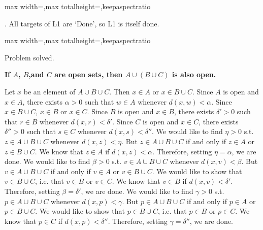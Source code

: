 \documentclass[a4paper,twoside,12pt]{article} %
\makeatletter
\DeclareRobustCommand{\_}{%
  \leavevmode\vbox{%
    \hrule\@width.4em
          \@height-.16ex
          \@depth\dimexpr.16ex+.28pt\relax}}
\newenvironment{fit}{\begin{adjustbox}{max width=\textwidth,max totalheight=\textheight,keepaspectratio}}{\end{adjustbox}}
\makeatother
\begin{document}
\begin{steps}
\begin{fit}
%
\end{fit}
\smallskip

. All targets of L1 are `Done', so L1 is itself done.\nopagebreak[4] 
\marginpar{}\nopagebreak[4] 
\smallskip\nopagebreak[4] 

\begin{fit}%
\end{fit}

Problem solved.
\cleardoublepage

\end{steps}
{\begin{center} \large \textbf{If $A$, $B$,and $C$ are open sets, then $A \cup (B \cup C)$ is also open.}\end{center}}\nopagebreak[4]

\begin{center}
\begin{minipage}{120mm}
Let $x$ be an element of $A\cup B\cup C$. Then $x\in A$ or $x\in B\cup C$. Since $A$ is open and $x\in A$, there exists $\alpha > 0$ such that $w\in A$\textrm{ whenever }$\textit{d}(x,w) < \alpha$. Since $x\in B\cup C$, $x\in B$ or $x\in C$. Since $B$ is open and $x\in B$, there exists $\delta' > 0$ such that $r\in B$\textrm{ whenever }$\textit{d}(x,r) < \delta'$. Since $C$ is open and $x\in C$, there exists $\delta'' > 0$ such that $s\in C$\textrm{ whenever }$\textit{d}(x,s) < \delta''$. We would like to find $\eta > 0$ s.t. $z\in A\cup B\cup C$\textrm{ whenever }$\textit{d}(x,z) < \eta$. But $z\in A\cup B\cup C$ if and only if $z\in A$ or $z\in B\cup C$. We know that $z\in A$ if $\textit{d}(x,z) < \alpha$. Therefore, setting $\eta = \alpha$, we are done. We would like to find $\beta > 0$ s.t. $v\in A\cup B\cup C$\textrm{ whenever }$\textit{d}(x,v) < \beta$. But $v\in A\cup B\cup C$ if and only if $v\in A$ or $v\in B\cup C$. We would like to show that $v\in B\cup C$, i.e. that $v\in B$ or $v\in C$. We know that $v\in B$ if $\textit{d}(x,v) < \delta'$. Therefore, setting $\beta = \delta'$, we are done. We would like to find $\gamma > 0$ s.t. $p\in A\cup B\cup C$\textrm{ whenever }$\textit{d}(x,p) < \gamma$. But $p\in A\cup B\cup C$ if and only if $p\in A$ or $p\in B\cup C$. We would like to show that $p\in B\cup C$, i.e. that $p\in B$ or $p\in C$. We know that $p\in C$ if $\textit{d}(x,p) < \delta''$. Therefore, setting $\gamma = \delta''$, we are done.
\end{minipage}
\end{center}
\end{document}
